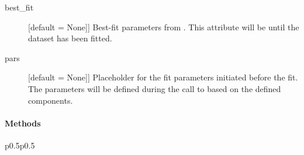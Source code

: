 \documentclass[letterpaper,10pt,english]{sphinxmanual}
\begin{document}
\begin{fulllineitems}
\begin{description}
\item[{best\_fit}] \leavevmode{[}   {[}default = None{]}{]}
Best-fit parameters from .
This attribute will be  until the dataset has been fitted.

\item[{pars}] \leavevmode{[}   {[}default = None{]}{]}
Placeholder for the fit parameters initiated before the fit.
The parameters will be defined during the call to {\hyperref[\detokenize{api:VoigtFit.DataSet.prepare_dataset}]{}} based on the defined components.

\end{description}
\paragraph{Methods}


\begin{savenotes}\sphinxatlongtablestart\begin{longtable}{p{0.5\linewidth}p{0.5\linewidth}}
\hline

\endfirsthead

%
{}\\
\hline

\endhead

\hline
{}\\
\endfoot

\endlastfoot


\end{longtable}
\end{savenotes}
\end{fulllineitems}
\end{document}
